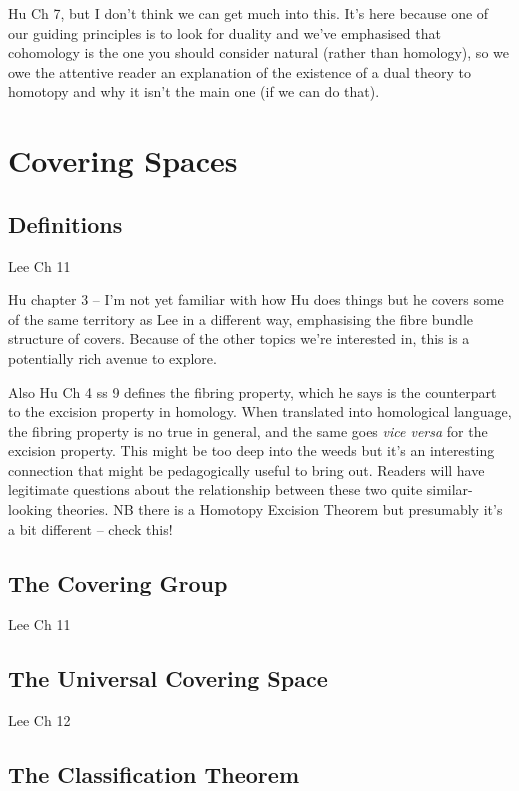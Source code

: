 \documentclass[oneside,english]{amsbook}
\numberwithin{section}{chapter}
\theoremstyle{plain}
\theoremstyle{definition}
\begin{document}
	Hu Ch 7, but I don't think we can get much into this. It's here because one of our guiding principles is to look for duality and we've emphasised that cohomology is the one you should consider natural (rather than homology), so we owe the attentive reader an explanation of the existence of a dual theory to homotopy and why it isn't the main one (if we can do that).	

	\chapter{Covering Spaces}
	
	\section{Definitions}
	
	Lee Ch 11
	
	Hu chapter 3 -- I'm not yet familiar with how Hu does things but he covers some of the same territory as Lee in a different way, emphasising the fibre bundle structure of covers. Because of the other topics we're interested in, this is a potentially rich avenue to explore.
	
	Also Hu Ch 4 ss 9 defines the fibring property, which he says is the counterpart to the excision property in homology. When translated into homological language, the fibring property is no true in general, and the same goes \emph{vice versa} for the excision property. This might be too deep into the weeds but it's an interesting connection that might be pedagogically useful to bring out. Readers will have legitimate questions about the relationship between these two quite similar-looking theories. NB there is a Homotopy Excision Theorem but presumably it's a bit different -- check this!

	\section{The Covering Group}
	
	Lee Ch 11
	
	\section{The Universal Covering Space}
	
	Lee Ch 12

	\section{The Classification Theorem}
	
\end{document}
